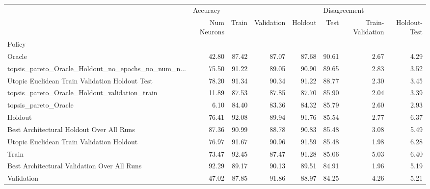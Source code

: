 \begin{table}
\centering
\label{tab:policy_metrics}
\begin{tabular}{lrrrrrrr}
\toprule
{} & \multicolumn{4}{l}{Accuracy} & \multicolumn{2}{l}{Disagreement} \\
{} & Num Neurons &    Train & Validation & Holdout &   Test & Train-Validation & Holdout-Test \\
Policy                                             &             &          &            &         &        &                  &              \\
\midrule
Oracle                                             &       42.80 &    87.42 &      87.07 &   87.68 &  90.61 &             2.67 &         4.29 \\
topsis\_pareto\_Oracle\_Holdout\_no\_epochs\_no\_num\_n... &       75.50 &    91.22 &      89.05 &   90.90 &  89.65 &             2.83 &         3.52 \\
Utopic Euclidean Train Validation Holdout Test     &       78.20 &    91.34 &      90.34 &   91.22 &  88.77 &             2.30 &         3.45 \\
topsis\_pareto\_Oracle\_Holdout\_validation\_train      &       11.89 &    87.53 &      87.85 &   87.70 &  85.90 &             2.04 &         3.39 \\
topsis\_pareto\_Oracle                               &        6.10 &    84.40 &      83.36 &   84.32 &  85.79 &             2.60 &         2.93 \\
Holdout                                            &       76.41 &    92.08 &      89.94 &   91.76 &  85.54 &             2.77 &         6.37 \\
Best Architectural Holdout Over All Runs           &       87.36 &    90.99 &      88.78 &   90.83 &  85.48 &             3.08 &         5.49 \\
Utopic Euclidean Train Validation Holdout          &       76.97 &    91.67 &      90.96 &   91.59 &  85.48 &             1.98 &         6.28 \\
Train                                              &       73.47 &    92.45 &      87.47 &   91.28 &  85.06 &             5.03 &         6.40 \\
Best Architectural Validation Over All Runs        &       92.29 &    89.17 &      90.13 &   89.51 &  84.91 &             1.96 &         5.19 \\
Validation                                         &       47.02 &    87.85 &      91.86 &   88.97 &  84.25 &             4.26 &         5.21 \\

\end{tabular}
\end{table}
